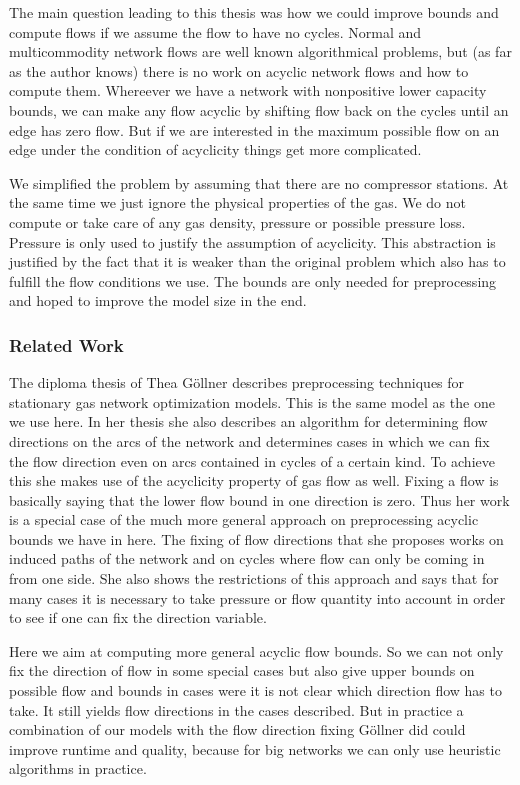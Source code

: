 The main question leading to this thesis was how we could improve bounds and compute flows if we assume the flow to 
have no cycles. Normal and multicommodity network flows are well known algorithmical problems, but (as far as the 
author knows) there is no work on acyclic network flows and how to compute them. 
Whereever we have a network with nonpositive lower capacity bounds, we can make any flow acyclic by shifting flow 
back on the cycles until an edge has zero flow. But if we are interested in the maximum possible flow on an edge under 
the condition of acyclicity things get more complicated. 

We simplified the problem by assuming that there are no compressor stations. At the same time we just ignore the 
physical properties of the gas. We do not compute or take care of any gas density, pressure or possible pressure loss. 
Pressure is only used to justify the assumption of acyclicity. This abstraction is justified by the fact that it is 
weaker than the original problem which also has to fulfill the flow conditions we use. The bounds are only needed 
for preprocessing and hoped to improve the model size in the end. 

\subsubsection{Related Work}
The diploma thesis of Thea Göllner \cite{DiplomarbeitTheaGoellner} describes preprocessing techniques for stationary gas 
network optimization models. This is the same model as the one we use here. In her thesis she also describes an 
algorithm for determining flow directions on the arcs of the network and determines cases in which we can fix the flow 
direction even on arcs contained in cycles of a certain kind. To achieve this she makes use of the acyclicity property 
of gas flow as well. 
Fixing a flow is basically saying that the lower flow bound in one direction is zero. Thus her work is a special case 
of the much more general approach on preprocessing acyclic bounds we have in here. The fixing of flow directions that 
she proposes works on induced paths of the network and on cycles where flow can only be coming in from one side. 
She also shows the restrictions of this approach and says that for many cases it is necessary to take pressure or flow 
quantity into account in order to see if one can fix the direction variable. 

Here we aim at computing more general acyclic flow bounds. So we can not only fix the direction of flow in some special 
cases but also give upper bounds on possible flow and bounds in cases were it is not clear which direction flow has to 
take. It still yields flow directions in the cases described. But in practice a combination of our models with the 
flow direction fixing Göllner did could improve runtime and quality, because for big networks we can only use heuristic 
algorithms in practice.
